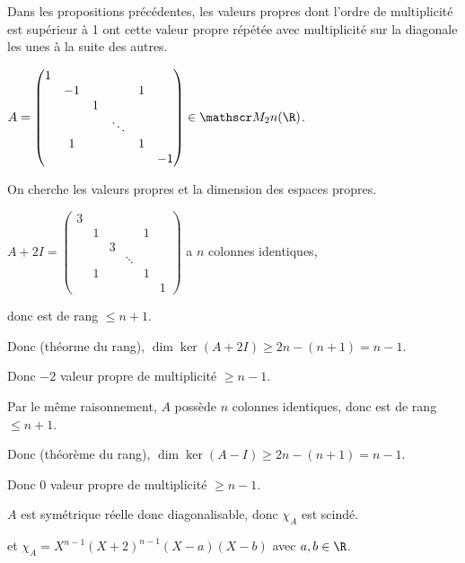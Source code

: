 \begin{remarque}
    Dans les propositions précédentes, les valeurs propres dont l'ordre de multiplicité est 
    supérieur à 1 ont cette valeur propre répétée avec multiplicité sur la 
    diagonale les unes à la suite des autres.
\end{remarque}


\begin{exemple}
    $A = \begin{pmatrix}
        1 & & & & & \\
        & -1 & & & 1 & \\
        & & 1 & & & \\
        & & & \ddots & & \\
        & 1 & & & 1 & \\
        & & & & & -1
        \end{pmatrix} \in \mathscr M_2n(\R)$.

        On cherche les valeurs propres et la dimension des espaces propres. 

        $A + 2I = \begin{pmatrix}
            3 & & & & & \\
            & 1 & & & 1 & \\
            & & 3 & & & \\
            & & & \ddots & & \\
            & 1 & & & 1 & \\
            & & & & & 1
        \end{pmatrix}$ a $n$ colonnes identiques, 
        
        donc est de rang $\leqslant n + 1$.

        Donc (théorme du rang), $\dim \ker(A + 2I) \geqslant 2n - (n + 1) = n - 1$.

        Donc $-2$ valeur propre de multiplicité $\geqslant n - 1$.

        Par le même raisonnement, $A$ possède $n$ colonnes identiques, donc est 
        de rang $\leqslant n + 1$.

        Donc (théorème du rang), $\dim \ker(A - I) \geqslant 2n - (n + 1) = n - 1$.

        Donc $0$ valeur propre de multiplicité $\geqslant n - 1$.

        $A$ est symétrique réelle donc diagonalisable, donc $\chi_A$ est scindé. 

        et $\chi_A = X^{n -1} (X + 2)^{n - 1} (X - a)(X - b)$ avec $a, b \in \R$.


\end{exemple}
